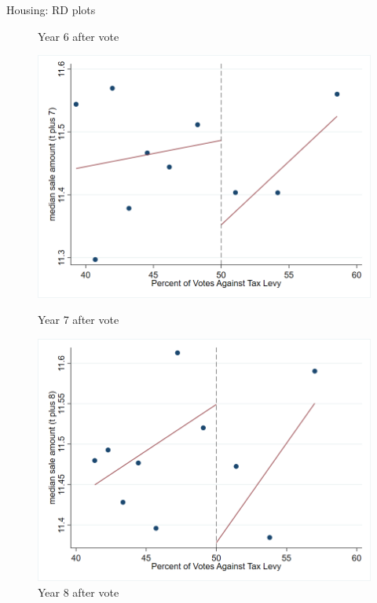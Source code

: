 \documentclass{beamer}
\begin{document}
\begin{frame}{Housing: RD plots}
\begin{figure}[htbp]
\begin{minipage}[b]{0.35\textwidth}
            \caption{Year 6 after vote}
        \end{minipage}
        \vspace{1em}
        \begin{minipage}[b]{0.35\textwidth}
            \centering
            \includegraphics[width=\textwidth]{assets/imgs/rd_plot_median_sale_amount_t_plus_7_tri_mserd_1_2_within.png}
            \caption{Year 7 after vote}
        \end{minipage}
        \hfill
        \begin{minipage}[b]{0.35\textwidth}
            \centering
            \includegraphics[width=\textwidth]{assets/imgs/rd_plot_median_sale_amount_t_plus_8_tri_mserd_1_2_within.png}
            \caption{Year 8 after vote}
        \end{minipage}
    \end{figure}
    
    \hyperlink{main_rd}{}

\end{frame}
\end{document}

